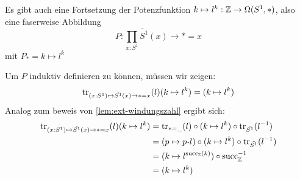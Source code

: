 \begin{lemma}
  Es gibt auch eine Fortsetzung der Potenzfunktion $k\mapsto l^{k}:\mathbb{Z}\to\Omega(S^1,\ast)$, also eine faserweise Abbildung
  \[
    P:\prod_{x:S^1}\tilde{S^1}(x)\to \ast=x
  \]
  mit $P_\ast=k\mapsto l^k$
\end{lemma}
\begin{beweis}
  Um $P$ induktiv definieren zu können, müssen wir zeigen:
  \[
    \mathrm{tr}_{(x:S^1)\mapsto \tilde{S^1}(x)\to \ast=x}(l)(k\mapsto l^k)=(k\mapsto l^k)
  \]
  Analog zum beweis von \cref{lem:ext-windungszahl} ergibt sich:
  \begin{align*}
    \transp_{(x:S^1)\mapsto \tilde{S^1}(x)\to \ast=x}(l)(k\mapsto l^k) &=\transp_{\ast=\_}(l) \circ (k\mapsto l^k) \circ \transp_{\tilde{S^1}}(l^{-1}) \\
                                                                          &=(p\mapsto p\kon l) \circ (k\mapsto l^k) \circ \transp_{\tilde{S^1}}(l^{-1}) \\
                                                                          &=(k\mapsto l^{\mathrm{succ}_\Z(k)}) \circ \mathrm{succ}_\Z^{-1} \\
                                                                       &=(k\mapsto l^k)
  \end{align*}
\end{beweis}

